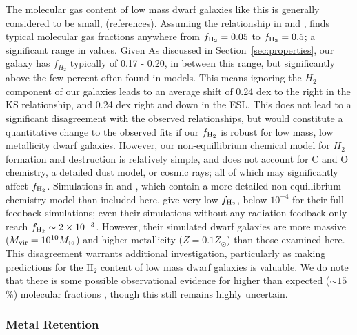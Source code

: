\documentclass[twocolumn]{aastex61}
\begin{document}
The molecular gas content of low mass dwarf galaxies like this is generally considered to be small, (references). Assuming the relationship in \citet{Leroy2013} and \citet{Momose2013}, \citet{Roychowdhury2014} finds typical molecular gas fractions anywhere from $f_{\rm H_2} = 0.05$ to $f_{\rm H_2} = 0.5$; a significant range in values. Given As discussed in Section~\ref{sec:properties}, our galaxy has $f_{H_2}$ typically of 0.17 - 0.20, in between this range, but significantly above the few percent often found in models. This means ignoring the $H_2$ component of our galaxies leads to an average shift of 0.24 dex to the right in the KS relationship, and 0.24 dex right and down in the ESL. This does not lead to a significant disagreement with the observed relationships, but would constitute a quantitative change to the observed fits if our $f_{\rm H_2}$ is robust for low mass, low metallicity dwarf galaxies. However, our non-equillibrium chemical model for $H_2$ formation and destruction is relatively simple, and does not account for C and O chemistry, a detailed dust model, or cosmic rays; all of which may significantly affect $f_{\rm H_2}$. Simulations in \citet{Hu2016} and \citet{Hu2017}, which contain a more detailed non-equillibrium chemistry model than included here, give very low $f_{\rm H_2}$, below $10^{-4}$ for their full feedback simulations; even their simulations without any radiation feedback only reach $f_{\rm H_2} \sim 2 \times 10^{-3}$. However, their simulated dwarf galaxies are more massive ($M_{\rm vir} = 10^{10} M_{\odot}$) and higher metallicity ($Z = 0.1 Z_{\odot}$) than those examined here. This disagreement warrants additional investigation, particularly as making predictions for the H$_2$ content of low mass dwarf galaxies is valuable. We do note that there is some possible observational evidence for higher than expected ($\sim 15$ \%) molecular fractions \citep{Schruba2017}, though this still remains highly uncertain.

\subsubsection{Metal Retention}
\label{sec:obs_metals}
\end{document}

